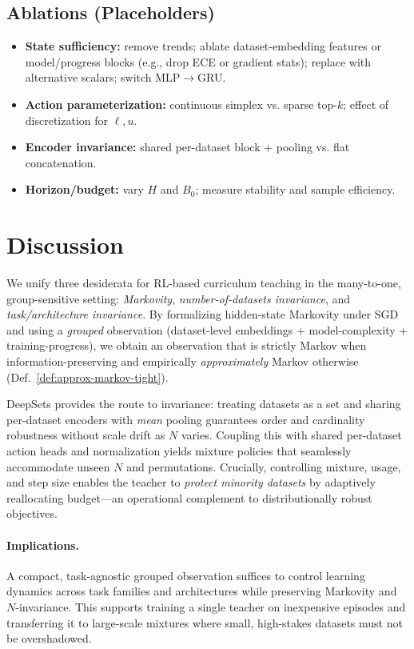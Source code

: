 \documentclass[11pt]{article}
\newcommand{\1}{\mathbf{1}}
\begin{document}
\subsection{Ablations (Placeholders)}
\begin{itemize}[leftmargin=1.5em]
\item \textbf{State sufficiency:} remove trends; ablate dataset-embedding features or model/progress blocks (e.g., drop ECE or gradient stats); replace with alternative scalars; switch MLP$\to$GRU.
\item \textbf{Action parameterization:} continuous simplex vs. sparse top-$k$; effect of discretization for $\ell,u$.
\item \textbf{Encoder invariance:} shared per-dataset block + pooling vs. flat concatenation.
\item \textbf{Horizon/budget:} vary $H$ and $B_0$; measure stability and sample efficiency.
\end{itemize}

\section{Discussion}
We unify three desiderata for RL-based curriculum teaching in the many-to-one, group-sensitive setting: \emph{Markovity}, \emph{number-of-datasets invariance}, and \emph{task/architecture invariance}. By formalizing hidden-state Markovity under SGD and using a \emph{grouped} observation (dataset-level embeddings + model-complexity + training-progress), we obtain an observation that is strictly Markov when information-preserving and empirically \emph{approximately} Markov otherwise (Def.~\ref{def:approx-markov-tight}). 

DeepSets provides the route to invariance: treating datasets as a set and sharing per-dataset encoders with \emph{mean} pooling guarantees order and cardinality robustness without scale drift as $N$ varies. Coupling this with shared per-dataset action heads and normalization yields mixture policies that seamlessly accommodate unseen $N$ and permutations. Crucially, controlling mixture, usage, and step size enables the teacher to \emph{protect minority datasets} by adaptively reallocating budget—an operational complement to distributionally robust objectives.

\paragraph{Implications.}
A compact, task-agnostic grouped observation suffices to control learning dynamics across task families and architectures while preserving Markovity and $N$-invariance. This supports training a single teacher on inexpensive episodes and transferring it to large-scale mixtures where small, high-stakes datasets must not be overshadowed.
\end{document}
